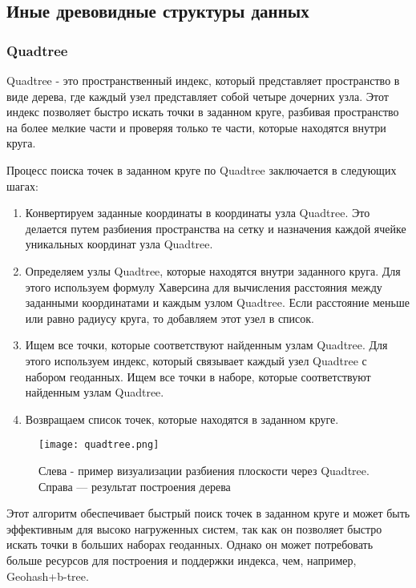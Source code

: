 
\subsection{Иные древовидные структуры данных}

\subsubsection{Quadtree}
Quadtree - это пространственный индекс, который представляет пространство в виде дерева, где каждый узел представляет собой четыре дочерних узла. Этот индекс позволяет быстро искать точки в заданном круге, разбивая пространство на более мелкие части и проверяя только те части, которые находятся внутри круга.

Процесс поиска точек в заданном круге по Quadtree заключается в следующих шагах:
\begin{enumerate}
    \item Конвертируем заданные координаты в координаты узла Quadtree. Это делается путем разбиения пространства на сетку и назначения каждой ячейке уникальных координат узла Quadtree.
    \item Определяем узлы Quadtree, которые находятся внутри заданного круга. Для этого используем формулу Хаверсина для вычисления расстояния между заданными координатами и каждым узлом Quadtree. Если расстояние меньше или равно радиусу круга, то добавляем этот узел в список.
    \item Ищем все точки, которые соответствуют найденным узлам Quadtree. Для этого используем индекс, который связывает каждый узел Quadtree с набором геоданных. Ищем все точки в наборе, которые соответствуют найденным узлам Quadtree.
    \item Возвращаем список точек, которые находятся в заданном круге.
\end{enumerate}

\begin{figure}[h]
    \centering
    \texttt{[image: quadtree.png]}
    \caption{Слева - пример визуализации разбиения плоскости через Quadtree. Справа — результат построения дерева}
\end{figure}

Этот алгоритм обеспечивает быстрый поиск точек в заданном круге и может быть эффективным для высоко нагруженных систем, так как он позволяет быстро искать точки в больших наборах геоданных. Однако он может потребовать больше ресурсов для построения и поддержки индекса, чем, например, Geohash+b-tree.

